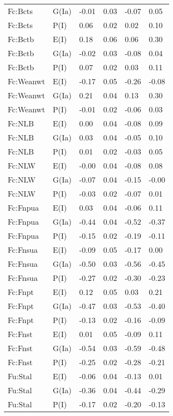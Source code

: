 \begin{center}
\begin{longtable}{|p{1.1in}|p{0.7in}|p{0.7in}|p{0.6in}|p{0.6in}|p{0.6in}|}
  Fc:Bcts & G(Ia) & -0.01 & 0.03 & -0.07 & 0.05 \\ 
  Fc:Bcts & P(I) & 0.06 & 0.02 & 0.02 & 0.10 \\ 
  Fc:Bctb & E(I) & 0.18 & 0.06 & 0.06 & 0.30 \\ 
  Fc:Bctb & G(Ia) & -0.02 & 0.03 & -0.08 & 0.04 \\ 
  Fc:Bctb & P(I) & 0.07 & 0.02 & 0.03 & 0.11 \\ 
  Fc:Weanwt & E(I) & -0.17 & 0.05 & -0.26 & -0.08 \\ 
  Fc:Weanwt & G(Ia) & 0.21 & 0.04 & 0.13 & 0.30 \\ 
  Fc:Weanwt & P(I) & -0.01 & 0.02 & -0.06 & 0.03 \\ 
  Fc:NLB & E(I) & 0.00 & 0.04 & -0.08 & 0.09 \\ 
  Fc:NLB & G(Ia) & 0.03 & 0.04 & -0.05 & 0.10 \\ 
  Fc:NLB & P(I) & 0.01 & 0.02 & -0.03 & 0.05 \\ 
  Fc:NLW & E(I) & -0.00 & 0.04 & -0.08 & 0.08 \\ 
  Fc:NLW & G(Ia) & -0.07 & 0.04 & -0.15 & -0.00 \\ 
  Fc:NLW & P(I) & -0.03 & 0.02 & -0.07 & 0.01 \\ 
  Fc:Fnpua & E(I) & 0.03 & 0.04 & -0.06 & 0.11 \\ 
  Fc:Fnpua & G(Ia) & -0.44 & 0.04 & -0.52 & -0.37 \\ 
  Fc:Fnpua & P(I) & -0.15 & 0.02 & -0.19 & -0.11 \\ 
  Fc:Fnsua & E(I) & -0.09 & 0.05 & -0.17 & 0.00 \\ 
  Fc:Fnsua & G(Ia) & -0.50 & 0.03 & -0.56 & -0.45 \\ 
  Fc:Fnsua & P(I) & -0.27 & 0.02 & -0.30 & -0.23 \\ 
  Fc:Fnpt & E(I) & 0.12 & 0.05 & 0.03 & 0.21 \\ 
  Fc:Fnpt & G(Ia) & -0.47 & 0.03 & -0.53 & -0.40 \\ 
  Fc:Fnpt & P(I) & -0.13 & 0.02 & -0.16 & -0.09 \\ 
  Fc:Fnst & E(I) & 0.01 & 0.05 & -0.09 & 0.11 \\ 
  Fc:Fnst & G(Ia) & -0.54 & 0.03 & -0.59 & -0.48 \\ 
  Fc:Fnst & P(I) & -0.25 & 0.02 & -0.28 & -0.21 \\ 
  Fu:Stal & E(I) & -0.06 & 0.04 & -0.13 & 0.01 \\ 
  Fu:Stal & G(Ia) & -0.36 & 0.04 & -0.44 & -0.29 \\ 
  Fu:Stal & P(I) & -0.17 & 0.02 & -0.20 & -0.13 \\ 

\end{longtable}
\end{center}
